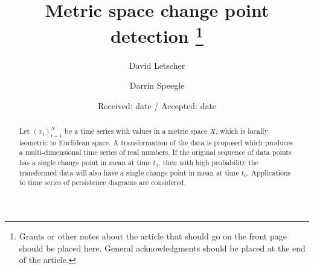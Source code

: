 \documentclass[smallextended]{svjour3}       %
\begin{document}
\title{Metric space change point detection \thanks{Grants or other notes about the article that should go on the front page
should be placed here. General acknowledgments should be placed at the
end of the article.} }



\author{  David Letscher \and  Darrin Speegle }



\date{Received: date / Accepted: date}


\maketitle

\begin{abstract}
Let \((x_t)_{t = 1}^N\) be a time series with values in a metric space
\(X\), which is locally isometric to Euclidean space. A transformation
of the data is proposed which produces a multi-dimensional time series
of real numbers. If the original sequence of data points has a single
change point in mean at time \(t_0\), then with high probability the
transformed data will also have a single change point in mean at time
\(t_0\). Applications to time series of persistence diagrams are
considered.
\\


\end{abstract}


\def\spacingset#1{\renewcommand{\baselinestretch}%
{#1}\small\normalsize} \spacingset{1}
\end{document}
